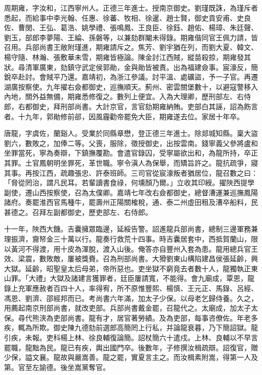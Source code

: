 \begin{pinyinscope}
周期雍，字汝和，江西寧州人。正德三年進士。授南京御史。劉瑾既誅，為瑾斥者悉起，而給事中李光翰、任惠、徐蕃、牧相、徐暹、趙士賢，御史貢安甫、史良佐、曹閔、王弘、葛浩、姚學禮、張鳴鳳、王良臣、徐鈺、趙佑、楊璋、朱廷聲、劉玉，部郎李夢陽、王綸、孫磐等，以兼劾群閹未得錄。期雍偕同官王佩力請，皆召用。兵部尚書王敞附瑾進，期雍請斥之。焦芳、劉宇猶在列，而劉大夏、韓文、楊守隨、林瀚、張敷華未雪，期雍皆極論。陳金討江西賊，縱苗殺掠，期雍發其狀。尋清軍廣東，劾鎮守武定侯郭勛，金與勛皆被責。出為福建僉事。宸濠反，簡銳卒赴討。會賊平乃還。嘉靖初，為浙江參議。討平溫、處礦盜，予一子官。再遷湖廣按察使。九年擢右僉都御史，巡撫順天。薊州、密雲關堡數十，以避寇警移入內地，關外益無備，期雍悉修復之。數列上便宜。入為大理卿，歷刑部左、右侍郎，右都御史，拜刑部尚書。大計京官，言官劾期雍納賄。吏部白其誣，詔為飭言者。十九年，郭勛修前郤，因風霾勸帝罷免大臣，期雍遂去位。家居十年卒。

唐龍，字虞佐，蘭谿人。受業於同縣章懋，登正德三年進士。除郯城知縣。稟大盜劉六，數敗之，加俸二等。父喪，服除，徵授御史，出按雲南。錢寧義父參將盧和坐罪當死，寧為奏辯，下鎮撫覆勘。會遣官錄囚，受寧屬欲出和，為龍所持，卒正其罪。土官鳳朝明坐罪死，革世職。寧令滇人為保舉，而矯旨許之。龍抗疏爭，寢其事。再按江西，疏趣張忠、許泰班師。三司官從宸濠叛者猶居位，龍召數之曰：「脅從罔治，謂凡民耳。若輩讀書食祿，何壎顏乃爾。」立收其印綬。擢陜西提學副使，遷山西按察使，召為太僕卿。嘉靖七年改右僉都御史，總督漕運兼巡撫鳳陽諸府。奏罷淮西官馬種牛，罷壽州正陽關榷稅，通、泰二州虛田租及漕卒船料，民甚德之。召拜左副都御史，歷吏部左、右侍郎。

十一年，陜西大饑。吉囊擁眾臨邊，延綏告警。詔進龍兵部尚書，總制三邊軍務兼理振濟，齎帑金三十萬以行。龍奏行救荒十四事。時吉囊居套中，西抵賀蘭山，限以黃河不得渡，用十皮為渾脫，渡入山後。俺答亦自豐州入套為患。龍用總兵官王效、梁震，數敗敵，屢被獎賚。召為刑部尚書。大猾劉東山構陷建昌侯張延齡，興大獄。延齡，昭聖皇太后母弟，帝所惡也。吏坐獄不窮竟去者數十人，龍獨執正東山罪。「大禮」大獄及諸建言獲罪者，廷臣屢請寬，不能得。會九廟成，覃恩，龍錄上充軍應赦者百四十人，率得宥，所不原惟豐熙、楊慎、王元正、馬錄、呂經、馮恩、劉濟、邵經邦而已。考尚書六年滿，加太子少保。以母老乞歸侍養。久之，用薦起南京刑部尚書，就改吏部。兵部尚書戴金罷，召龍代之。太廟成，加太子太保。尋代熊浹為吏部尚書。龍有才，居官著勞績。及為吏部，每事咨僚佐。年老多疾，輒為所欺。御史陳九德劾前選郎高簡罔上行私，并論龍衰暮，乃下簡詔獄。龍引疾，未報。吏科楊上林、徐良輔復論簡。詔杖簡六十遣戍。上林、良輔以不早言罷職，龍黜為民。龍已有疾，輿出國門卒。後數年，子修撰汝楫疏辯。詔復官，贈少保，謚文襄。龍故與嚴嵩善。龍之罷，實夏言主之。而汝楫素附嵩，得第一人及第。官至左諭德。後坐嵩黨奪官。


\end{pinyinscope}
